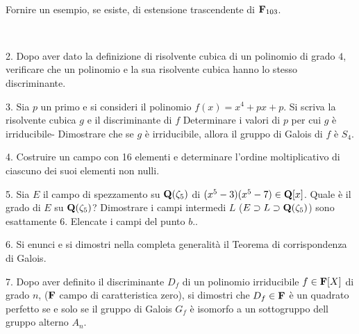 \ \dotfill\ \bigskip\bigskip\bigskip\vfil

 Fornire un esempio, se esiste, di estensione trascendente di ${\bf F}_{103}$.\medskip\bigskip\bigskip

\ \dotfill\ \bigskip\bigskip\bigskip

\vfil\eject


\item{2.} Dopo aver dato la definizione di risolvente cubica di un polinomio di grado $4$, verificare che un polinomio e la sua risolvente cubica hanno lo stesso discriminante.  
\vv


\item{3.} Sia $p$ un primo e si consideri il polinomio $f(x)=x^4 + px + p$.
 Si scriva la risolvente cubica $g$ e il discriminante di $f$
 Determinare i valori di $p$ per cui $g$ \`e
irriducibile-
 Dimostrare che se $g$ \`e irriducibile, allora
il gruppo di Galois di $f$ \`e $S_4$.
\vv



\item{4.} Costruire un campo con 16 elementi e determinare l'ordine moltiplicativo di ciascuno dei suoi elementi non nulli.  
\ve\ \vs

\item{5.} Sia $E$ il campo di spezzamento su ${\bf Q}(\zeta_5)$ di $(x^5-3)(x^5-7)\in{\bf Q}[x]$. 
 Quale \`e il grado di $E$ su ${\bf Q}(\zeta_5)$?
 Dimostrare i campi intermedi $L$ ($E\supset L\supset{\bf Q}(\zeta_5)$) sono esattamente $6$.
 Elencate i campi del punto $b.$.
\vv


\item{6.} Si enunci e si dimostri nella completa generalit\`a il Teorema di
corrispondenza di Galois.\vv


\item{7.} Dopo aver definito il discriminante $D_f$ di un polinomio irriducibile $f\in{\bf F}[X]$ di grado $n$, (${\bf F}$ campo di caratteristica zero), 
si dimostri che $D_f\in{\bf F}$ \`e un quadrato perfetto se e solo se il gruppo di Galois $G_f$ \`e isomorfo a un sottogruppo dell
gruppo alterno $A_n$.\ve\ \vs

